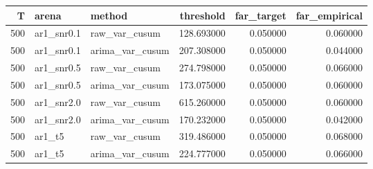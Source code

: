 \begin{tabular}{rllrrr}
\toprule
T & arena & method & threshold & far_target & far_empirical \\
\midrule
500 & ar1_snr0.1 & raw_var_cusum & 128.693000 & 0.050000 & 0.060000 \\
500 & ar1_snr0.1 & arima_var_cusum & 207.308000 & 0.050000 & 0.044000 \\
500 & ar1_snr0.5 & raw_var_cusum & 274.798000 & 0.050000 & 0.066000 \\
500 & ar1_snr0.5 & arima_var_cusum & 173.075000 & 0.050000 & 0.060000 \\
500 & ar1_snr2.0 & raw_var_cusum & 615.260000 & 0.050000 & 0.060000 \\
500 & ar1_snr2.0 & arima_var_cusum & 170.232000 & 0.050000 & 0.042000 \\
500 & ar1_t5 & raw_var_cusum & 319.486000 & 0.050000 & 0.068000 \\
500 & ar1_t5 & arima_var_cusum & 224.777000 & 0.050000 & 0.066000 \\
\bottomrule
\end{tabular}
